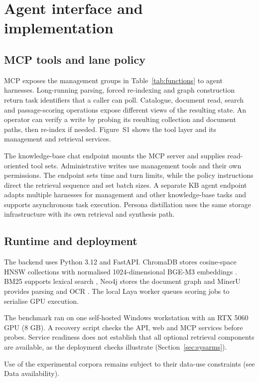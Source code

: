 \section{Agent interface and implementation}
\label{sec:implementation}
\label{sec:impl}

\subsection{MCP tools and lane policy}
\label{sec:impl-tools}

MCP exposes the management groups in Table~\ref{tab:functions} to agent
harnesses. Long-running parsing, forced re-indexing and graph construction
return task identifiers that a caller can poll. Catalogue, document read,
search and passage-scoring operations expose different views of the
resulting state. An operator can verify a write by probing its resulting
collection and document paths, then re-index if needed. Figure~S1 shows the tool layer and
its management and retrieval services.

The knowledge-base chat endpoint mounts the MCP server and supplies
read-oriented tool sets. Administrative writes use management tools and
their own permissions. The endpoint sets time and turn limits, while the
policy instructions direct the retrieval sequence and set batch sizes.
A separate KB agent endpoint adapts multiple harnesses for management and
other knowledge-base tasks and supports asynchronous task execution.
Persona distillation uses the same storage infrastructure with its own
retrieval and synthesis path.

\subsection{Runtime and deployment}
\label{sec:impl-runtime}

The backend uses Python 3.12 and FastAPI. ChromaDB stores cosine-space HNSW
collections with normalised 1024-dimensional BGE-M3 embeddings
\cite{chroma,hnsw,bge-m3}. BM25 supports lexical search \cite{bm25}, Neo4j
stores the document graph \cite{neo4j} and MinerU provides parsing and OCR
\cite{mineru}. The local Laya worker queues scoring jobs to serialise GPU
execution.

The benchmark ran on one self-hosted Windows workstation with an RTX
5060 GPU (8 GB). A recovery script checks the API, web and MCP services
before probes. Service readiness does not establish that all optional
retrieval components are available, as the deployment checks
illustrate (Section~\ref{sec:sysarms}).

Use of the experimental corpora remains subject to their data-use
constraints (see Data availability).
